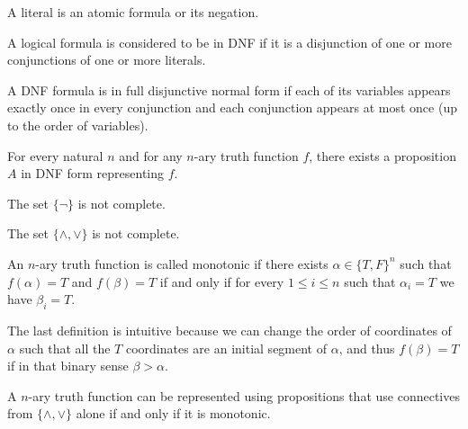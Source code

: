 \documentclass[11pt,a4paper]{article}
\begin{document}
\begin{definition}[Literal]
  A literal is an atomic formula or its negation.
\end{definition}

\begin{definition}
  A logical formula is considered to be in DNF if it is a disjunction of 
  one or more conjunctions of one or more literals.
\end{definition}

\begin{remark}
  A DNF formula is in full disjunctive normal form if each of its 
  variables appears exactly once in every conjunction and each 
  conjunction appears at most once (up to the order of variables).
\end{remark}

\begin{proposition}
  For every natural $n$ and for any $n$-ary truth function $f$,
  there exists a proposition $A$ in DNF form representing $f$.
\end{proposition}

\begin{proposition}
  The set $\{\neg\}$ is not complete.
\end{proposition}

\begin{proposition}
  The set $\{\land, \lor\}$ is not complete.
\end{proposition}

\begin{definition}
  An $n$-ary truth function is called monotonic if there exists
  $\alpha \in \{T, F\}^n$ such that $f(\alpha) = T$ and $f(\beta) = T$
  if and only if for every $1 \le i \le n$ such that $\alpha_i = T$
  we have $\beta_i = T$.
\end{definition}

\begin{remark}
  The last definition is intuitive because we can change the order of
  coordinates of $\alpha$ such that all the $T$ coordinates are an
  initial segment of $\alpha$, and thus $f(\beta) = T$ if in that binary
  sense $\beta > \alpha$.
\end{remark}

\begin{proposition}
  A $n$-ary truth function can be represented using propositions that use
  connectives from $\{\land, \lor\}$ alone if and only if it is monotonic.
\end{proposition}
\end{document}
